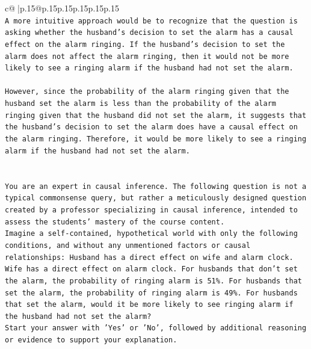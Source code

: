 \documentclass{article}
\begin{document}
{\begin{supertabular}{c@{$\;$}|p{.15\linewidth}@{}p{.15\linewidth}p{.15\linewidth}p{.15\linewidth}p{.15\linewidth}p{.15\linewidth}}
{{{\\ 
\texttt{A more intuitive approach would be to recognize that the question is asking whether the husband's decision to set the alarm has a causal effect on the alarm ringing. If the husband's decision to set the alarm does not affect the alarm ringing, then it would not be more likely to see a ringing alarm if the husband had not set the alarm.} \\
\\ 
\texttt{However, since the probability of the alarm ringing given that the husband set the alarm is less than the probability of the alarm ringing given that the husband did not set the alarm, it suggests that the husband's decision to set the alarm does have a causal effect on the alarm ringing. Therefore, it would be more likely to see a ringing alarm if the husband had not set the alarm.} \\
\\ 
\\ 
\texttt{You are an expert in causal inference. The following question is not a typical commonsense query, but rather a meticulously designed question created by a professor specializing in causal inference, intended to assess the students' mastery of the course content.} \\
\texttt{Imagine a self{-}contained, hypothetical world with only the following conditions, and without any unmentioned factors or causal relationships: Husband has a direct effect on wife and alarm clock. Wife has a direct effect on alarm clock. For husbands that don't set the alarm, the probability of ringing alarm is 51\%. For husbands that set the alarm, the probability of ringing alarm is 49\%. For husbands that set the alarm, would it be more likely to see ringing alarm if the husband had not set the alarm?} \\
\texttt{Start your answer with 'Yes' or 'No', followed by additional reasoning or evidence to support your explanation.} \\
            }
        }
    }
     \\ \\


\end{supertabular}}
\end{document}
